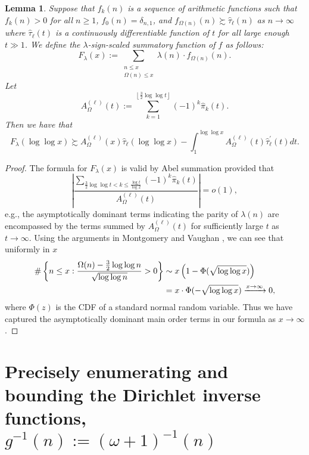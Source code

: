 \documentclass[11pt,reqno,a4letter]{article}
\numberwithin{figure}{section}
\numberwithin{table}{section}
\newcommand{\floor}[1]{\left\lfloor #1 \right\rfloor}
\theoremstyle{plain}
\newtheorem{lemma}[theorem]{Lemma}
\numberwithin{theorem}{section}
\theoremstyle{definition}
\begin{document}
\begin{lemma} 
\label{lemma_CLT_and_AbelSummation} 
Suppose that $f_k(n)$ is a sequence of arithmetic functions 
such that $f_k(n) > 0$ for all $n \geq 1$, $f_0(n) = \delta_{n,1}$, and 
$f_{\Omega(n)}(n) \succsim \widehat{\tau}_{\ell}(n)$ as $n \rightarrow \infty$ where 
$\widehat{\tau}_{\ell}(t)$ is a continuously differentiable function of $t$ for all 
large enough $t \gg 1$.  
We define the $\lambda$-sign-scaled summatory function of $f$ as follows: 
\[
F_{\lambda}(x) := \sum_{\substack{n \leq x \\ \Omega(n) \leq x}} 
     \lambda(n) \cdot f_{\Omega(n)}(n). 
\]
Let 
\[
A_{\Omega}^{(\ell)}(t) := \sum_{k=1}^{\floor{\frac{3}{2} \log\log t}} (-1)^k \widehat{\pi}_k(t). 
\]
Then we have that 
\[
F_{\lambda}(\log\log x) \succsim A_{\Omega}^{(\ell)}(x) \widehat{\tau}_{\ell}(\log\log x) - 
     \int_1^{\log\log x} 
     A_{\Omega}^{(\ell)}(t) \widehat{\tau}_{\ell}^{\prime}(t) dt. 
\]
\end{lemma}
\begin{proof} 
The formula for $F_{\lambda}(x)$ is valid by Abel summation provided that 
\[
\left\lvert \frac{\displaystyle\sum\limits_{\frac{3}{2} \log\log t < k \leq \frac{\log t}{\log 2}} 
     (-1)^k \widehat{\pi}_k(t)}{A_{\Omega}^{(\ell)}(t)}\right\rvert = o(1), 
\]
e.g., the asymptotically dominant terms indicating the parity of 
$\lambda(n)$ are encompassed by the terms summed by $A_{\Omega}^{(\ell)}(t)$ for 
sufficiently large $t$ as $t \rightarrow \infty$. 
Using the arguments in Montgomery and Vaughan \cite[\S 7; Thm.\ 7.21]{MV}, we can see that 
uniformly in $x$ 
\begin{align} 
\label{eqn_ProbCLT_for_Omegan_cited_result} 
\#\left\{n \leq x: \frac{\Omega(n) - \frac{3}{2}\log\log n}{\sqrt{\log\log n}} > 0\right\} & \sim
     x \left(1-\Phi(\sqrt{\log\log x})\right) \\ 
\notag 
     & = x \cdot \Phi(-\sqrt{\log\log x}) \xrightarrow{x \rightarrow \infty} 0, 
\end{align} 
where $\Phi(z)$ is the CDF of a standard normal random variable. 
Thus we have captured the asymptotically dominant main order terms in our formula as 
$x \rightarrow \infty$. 
\end{proof} 

\newpage
\section{Precisely enumerating and bounding the 
         Dirichlet inverse functions, $g^{-1}(n) := (\omega+1)^{-1}(n)$} 
\label{Section_InvFunc_PreciseExpsAndAsymptotics} 
\end{document}
